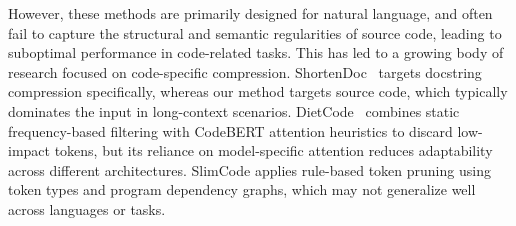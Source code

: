 \documentclass[10pt,conference]{IEEEtran}
\newcommand{\todoc}[2]{{\textcolor{#1}{\textbf{[#2]}}}}
\newcommand{\shi}[1]{\todoc{orange}{Shi: #1}}
\newcommand{\qian}[1]{\todoc{violet}{Qian: #1}}
\begin{document}
However, these methods are primarily designed for natural language, and often fail to capture the structural and semantic regularities of source code, leading to suboptimal performance in code-related tasks. This has led to a growing body of research focused on code-specific compression. ShortenDoc~\cite{yang2024less} targets docstring compression specifically, whereas our method targets source code, which typically dominates the input in long-context scenarios. DietCode~\cite{zhang2022diet} combines static frequency-based filtering with CodeBERT attention heuristics to discard low-impact tokens, but its reliance on model-specific attention reduces adaptability across different architectures. SlimCode\cite{wang2024natural} applies rule-based token pruning using token types and program dependency graphs, which may not generalize well across languages or tasks. 
\end{document}
